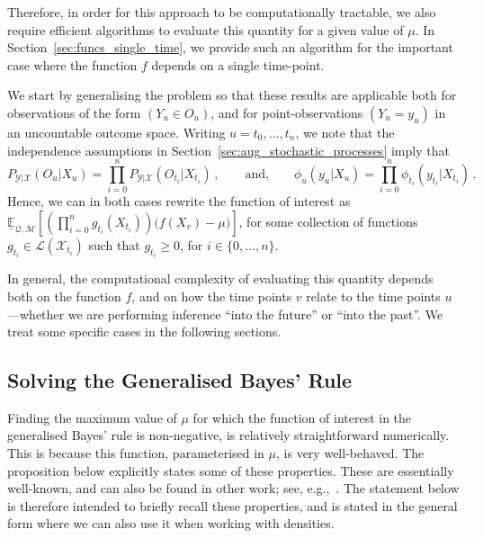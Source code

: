 \documentclass[twoside,11pt]{article}
\newcommand{\states}{\mathcal{X}}
\newcommand{\observs}{\mathcal{Y}}
\newcommand{\lexp}{\underline{\mathbb{E}}_{\rateset,\mathcal{M}}}
\newcommand{\gambles}{\mathcal{L}}
\newcommand{\rateset}{\mathcal{Q}}
\begin{document}
Therefore, in order for this approach to be computationally tractable, we also require efficient algorithms to evaluate this quantity for a given value of $\mu$. In Section~\ref{sec:funcs_single_time}, we provide such an algorithm for the important case where the function $f$ depends on a single time-point.

We start by generalising the problem so that these results are applicable both for observations of the form $(Y_u\in O_u)$, and for point-observations $(Y_u=y_u)$ in an uncountable outcome space. Writing $u=t_0,\ldots,t_n$, we note that the independence assumptions in Section~\ref{sec:aug_stochastic_processes} imply that
\begin{equation*}
P_{\observs\vert\states}(O_u\vert X_u) = \prod_{i=0}^nP_{\observs\vert\states}(O_{t_i}\vert X_{t_i})\,,\quad\quad\text{and,}\quad\quad \phi_u(y_u\vert X_u) = \prod_{i=0}^n\phi_{t_i}(y_{t_i}\vert X_{t_i})\,.
\end{equation*}
Hence, we can in both cases rewrite the function of interest as
$\lexp\left[ \left(\prod_{i=0}^ng_{t_i}(X_{t_i})\right)\bigl(f(X_v) - \mu\bigr) \right]$,
for some collection of functions $g_{t_i}\in\gambles(\states_{t_i})$ such that $g_{t_i}\geq 0$, for $i\in\{0,\ldots,n\}$.

In general, the computational complexity of evaluating this quantity depends both on the function $f$, and on how the time points $v$ relate to the time points $u$---whether we are performing inference ``into the future'' or ``into the past''. We treat some specific cases in the following sections.

\subsection{Solving the Generalised Bayes' Rule}\label{sec:gbr}

Finding the maximum value of $\mu$ for which the function of interest in the generalised Bayes' rule is non-negative, is relatively straightforward numerically. This is because this function, parameterised in $\mu$, is very well-behaved. The proposition below explicitly states some of these properties. These are essentially well-known, and can also be found in other work; see, e.g.,~\cite[Section 2.7.3]{de2015credal}. The statement below is therefore intended to briefly recall these properties, and is stated in the general form where we can also use it when working with densities.
\end{document}
